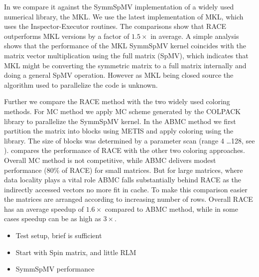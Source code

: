 In  we compare it against the \acrshort{SymmSpMV} 
implementation of a widely used numerical library, the \acrshort{MKL}. 
We use the latest implementation of MKL, which uses the Inspector-Executor routines.
The comparisons show that \acrshort{RACE} outperforms MKL
versions by a factor of $1.5\times$ in average. A simple analysis
shows that the performance of the \acrshort{MKL} \acrshort{SymmSpMV} 
kernel coincides with the matrix vector multiplication using the full
matrix (\acrshort{SpMV}), which indicates that MKL might be converting
the symmetric matrix to a full matrix internally and doing a general \acrshort{SpMV}
operation. However as MKL being closed source  the algorithm 
used to parallelize the code is unknown.

Further we compare the \acrshort{RACE} method with the two widely used
coloring methods. For \acrshort{MC} method we apply \acrlong{MC} scheme
generated by the COLPACK \cite{COLPACK} library to parallelize the \acrshort{SymmSpMV}
kernel. In the \acrshort{ABMC} method we first partition the matrix into blocks
using METIS \cite{METIS} and apply coloring using the \COLPACK library. The
size of blocks was determined by a parameter scan (range 4 \ldots 128, see \cite{ABMC}).
 compares the performance of \acrshort{RACE} with the other 
two coloring approaches.
Overall \acrshort{MC} method is not competitive, while \acrshort{ABMC} delivers
modest performance ($80 \%$ of \acrshort{RACE}) for small matrices. But for large
matrices,  where data locality plays a vital role \acrshort{ABMC} 
falls substantially behind \acrshort{RACE} as the indirectly
accessed vectors no more fit in cache. To make this comparison easier
the matrices are arranged according to increasing number of rows.
Overall \acrshort{RACE} has an average speedup of $1.6\times$ compared to 
\acrshort{ABMC} method, while in some cases speedup can be as high as $3\times$.



\begin{itemize}
	\item Test setup, brief is sufficient
	\item Start with Spin matrix, and little RLM
	\item SymmSpMV performance
\end{itemize}


